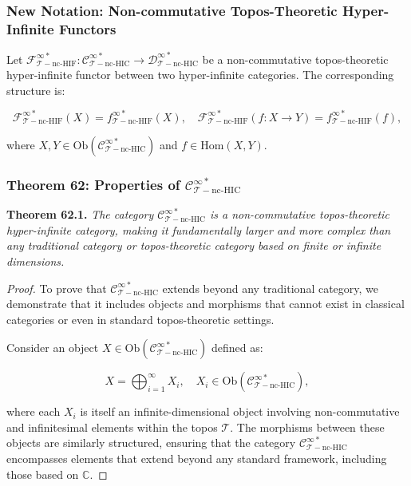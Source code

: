 \documentclass{article}
\begin{document}
\subsubsection{New Notation: Non-commutative Topos-Theoretic Hyper-Infinite Functors}
Let \(\mathcal{F}_{\mathcal{T}-\text{nc-HIF}}^{\infty *}: \mathcal{C}_{\mathcal{T}-\text{nc-HIC}}^{\infty *} \to \mathcal{D}_{\mathcal{T}-\text{nc-HIC}}^{\infty *}\) be a non-commutative topos-theoretic hyper-infinite functor between two hyper-infinite categories. The corresponding structure is:

\[
\mathcal{F}_{\mathcal{T}-\text{nc-HIF}}^{\infty *}(X) = f_{\mathcal{T}-\text{nc-HIF}}^{\infty *}(X), \quad \mathcal{F}_{\mathcal{T}-\text{nc-HIF}}^{\infty *}(f: X \to Y) = f_{\mathcal{T}-\text{nc-HIF}}^{\infty *}(f),
\]

where \(X, Y \in \text{Ob}(\mathcal{C}_{\mathcal{T}-\text{nc-HIC}}^{\infty *})\) and \(f \in \text{Hom}(X, Y)\).

\subsubsection{Theorem 62: Properties of \(\mathcal{C}_{\mathcal{T}-\text{nc-HIC}}^{\infty *}\)}
\textbf{Theorem 62.1.} \textit{The category \(\mathcal{C}_{\mathcal{T}-\text{nc-HIC}}^{\infty *}\) is a non-commutative topos-theoretic hyper-infinite category, making it fundamentally larger and more complex than any traditional category or topos-theoretic category based on finite or infinite dimensions.}

\begin{proof}
To prove that \(\mathcal{C}_{\mathcal{T}-\text{nc-HIC}}^{\infty *}\) extends beyond any traditional category, we demonstrate that it includes objects and morphisms that cannot exist in classical categories or even in standard topos-theoretic settings.

Consider an object \(X \in \text{Ob}(\mathcal{C}_{\mathcal{T}-\text{nc-HIC}}^{\infty *})\) defined as:

\[
X = \bigoplus_{i=1}^{\infty} X_i, \quad X_i \in \text{Ob}(\mathcal{C}_{\mathcal{T}-\text{nc-HIC}}^{\infty *}),
\]

where each \(X_i\) is itself an infinite-dimensional object involving non-commutative and infinitesimal elements within the topos \(\mathcal{T}\). The morphisms between these objects are similarly structured, ensuring that the category \(\mathcal{C}_{\mathcal{T}-\text{nc-HIC}}^{\infty *}\) encompasses elements that extend beyond any standard framework, including those based on \(\mathbb{C}\).
\end{proof}
\end{document}
